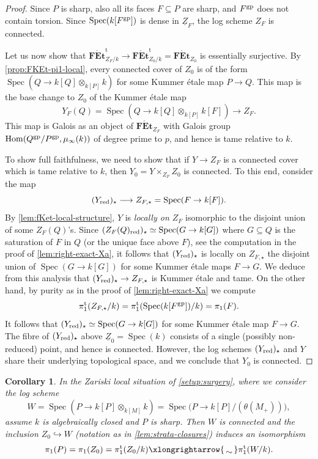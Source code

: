 \documentclass[a4paper,twoside,11pt,reqno]{amsart}
\newcommand{\inj}{\hookrightarrow}
\newcommand{\isomto}{\xlongrightarrow{\,\smash{\raisebox{-0.65ex} 
    {\ensuremath{\displaystyle\sim}}}\,}}
\newcommand{\la}{\longrightarrow}
\DeclareMathOperator{\Hom}{Hom}
\DeclareMathOperator{\Spec}{Spec}
\newcommand{\gp}{{\rm gp}}
\newcommand{\cat}[1]{\mathbf{#1}}
\newcommand{\FEt}{\cat{F\acute{E}t}}
\newcommand{\pitame}{\pi_1^{\mathrm{t}}}
\newcommand{\FEtt}{{\cat{F\acute{E}t}}^{\!\mathrm{t}}}
\newtheorem{cor}[thm]{Corollary}
\theoremstyle{definition}
\numberwithin{equation}{subsection}
\begin{document}
\begin{proof}
Since $P$ is sharp, also all its faces $F \subseteq P$ are sharp, and $F^\gp$ does not contain torsion. Since $\Spec(k[F^\gp])$ is dense in $\underline{Z}_F$, the log scheme $Z_F$ is connected. 

Let us now show that $\FEtt_{Z_F/k}\to \FEtt_{Z_0/k} = \FEt_{Z_0}$ is essentially surjective. By \cref{prop:FKEt-pi1-local}, every connected cover of $Z_0$ is of the form $\Spec(Q\to k[Q]\otimes_{k[P]} k)$ for some Kummer \'etale map $P\to Q$. This map is the base change to $Z_0$ of the Kummer \'etale map
\[
    Y_F(Q) = \Spec(Q \to k[Q] \otimes_{k[P]} k[F]) \la Z_F.
\]
This map is Galois as an object of $\FEt_{Z_F}$ with Galois group $\Hom(Q^\gp/P^\gp,\mu_\infty(k))$ 
of degree prime to $p$, and hence is tame relative to $k$. 

To show full faithfulness, we need to show that if $Y \to Z_F$ is a connected cover which is tame relative to $k$, then $Y_0 = Y \times_{Z_F} Z_0$ is connected. To this end, consider the map 
\[
    (Y_{\rm red})_\star \la Z_{F,\star} = \Spec(F \to k[F]).
\]
By \cref{lem:fKet-local-structure}, $Y$ is \emph{locally on $Z_F$} isomorphic to the disjoint union of some $Z_F(Q)$'s. Since $(Z_F(Q)_{\rm red})_\star \simeq \Spec(G\to k[G])$ where $G \subseteq Q$ is the saturation of $F$ in $Q$ (or the unique face above $F$), see the computation in the proof of \cref{lem:right-exact-Xa}, it follows that $(Y_{\rm red})_\star$ is locally on $Z_{F,\star}$ the disjoint union of $\Spec(G \to k[G])$ for some Kummer \'etale maps $F \to G$. We deduce from this analysis that $(Y_{\rm red})_\star \to Z_{F,\star}$ is Kummer \'etale and tame. 
On the other hand, by purity as in the proof of \cref{lem:right-exact-Xa} we compute 
\[
\pitame(Z_{F,\star}/k) = \pitame(\Spec(k[F^{\rm gp}])/k) = \pi_1(F).
\]
It follows that 
$(Y_{\rm red})_\star \simeq \Spec(G\to k[G])$
for some Kummer \'etale map $F\to G$. The fibre of $(Y_{\rm red})_\star$ above $\underline{Z}_0=\Spec(k)$ consists of a single (possibly non-reduced) point, and hence is connected. However, the log schemes $(Y_{\rm red})_\star$ and $Y$ share their underlying topological space, and we conclude that $Y_0$ is connected.
\end{proof}

\begin{cor} \label{cor:Paul}
    In the Zariski local situation of \cref{setup:surgery}, where we consider the log scheme  
    \[
         W = \Spec(P\to k[P]\otimes_{k[M]} k) = \Spec\big(P\to k[P]/(\theta(M_+))\big),
    \]  
    assume $k$ is algebraically closed and $P$ is sharp. Then $W$ is connected and the inclusion $Z_0 \inj W$ (notation as in \cref{lem:strata-closures}) induces an isomorphism
    \[
        \pi_1(P) = \pi_1(Z_0) = \pitame(Z_0/k) \isomto \pitame(W/k). 
    \]   
\end{cor}
\end{document}
